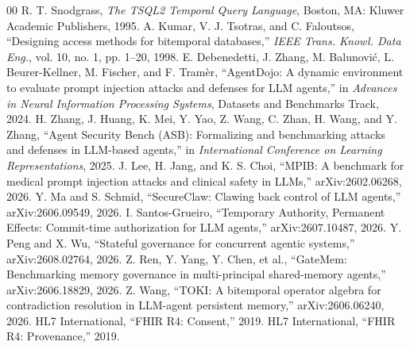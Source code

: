 \documentclass[conference]{IEEEtran}
\begin{document}
\balance
\begin{thebibliography}{00}
 R. T. Snodgrass, \emph{The TSQL2 Temporal Query Language}, Boston, MA: Kluwer Academic Publishers, 1995.
 A. Kumar, V. J. Tsotras, and C. Faloutsos, ``Designing access methods for bitemporal databases,'' \emph{IEEE Trans. Knowl. Data Eng.}, vol. 10, no. 1, pp. 1--20, 1998.
 E. Debenedetti, J. Zhang, M. Balunovi\'c, L. Beurer-Kellner, M. Fischer, and F. Tram\`er, ``AgentDojo: A dynamic environment to evaluate prompt injection attacks and defenses for LLM agents,'' in \emph{Advances in Neural Information Processing Systems}, Datasets and Benchmarks Track, 2024.
 H. Zhang, J. Huang, K. Mei, Y. Yao, Z. Wang, C. Zhan, H. Wang, and Y. Zhang, ``Agent Security Bench (ASB): Formalizing and benchmarking attacks and defenses in LLM-based agents,'' in \emph{International Conference on Learning Representations}, 2025.
 J. Lee, H. Jang, and K. S. Choi, ``MPIB: A benchmark for medical prompt injection attacks and clinical safety in LLMs,'' arXiv:2602.06268, 2026.
 Y. Ma and S. Schmid, ``SecureClaw: Clawing back control of LLM agents,'' arXiv:2606.09549, 2026.
 I. Santos-Grueiro, ``Temporary Authority, Permanent Effects: Commit-time authorization for LLM agents,'' arXiv:2607.10487, 2026.
 Y. Peng and X. Wu, ``Stateful governance for concurrent agentic systems,'' arXiv:2608.02764, 2026.
 Z. Ren, Y. Yang, Y. Chen, et al., ``GateMem: Benchmarking memory governance in multi-principal shared-memory agents,'' arXiv:2606.18829, 2026.
 Z. Wang, ``TOKI: A bitemporal operator algebra for contradiction resolution in LLM-agent persistent memory,'' arXiv:2606.06240, 2026.
 HL7 International, ``FHIR R4: Consent,'' 2019.
 HL7 International, ``FHIR R4: Provenance,'' 2019.
\end{thebibliography}
\end{document}
